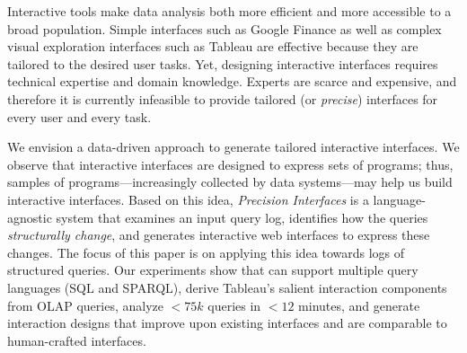 Interactive tools make data analysis both more efficient and more accessible to a broad population.  Simple interfaces such as Google Finance as well as complex visual exploration interfaces such as Tableau are effective because they are tailored to the desired user tasks. Yet, designing interactive interfaces requires technical expertise and domain knowledge. Experts are scarce and expensive, and therefore it is currently infeasible to provide tailored (or {\it precise}) interfaces for every user and every task.

We envision a data-driven approach to generate tailored interactive interfaces. We observe that interactive interfaces are designed to express sets of programs; thus, samples of programs---increasingly collected by data systems---may help us build interactive interfaces.  Based on this idea, {\it Precision Interfaces} is a language-agnostic system that examines an input query log, identifies how the queries {\it structurally change}, and generates interactive web interfaces to express these changes.  The focus of this paper is on applying this idea towards logs of structured queries.  Our experiments show that \sys can support multiple query languages (SQL and SPARQL), derive Tableau's salient interaction components from OLAP queries, analyze $<75k$ queries in $<12$ minutes, and generate interaction designs that improve upon existing interfaces and are comparable to human-crafted interfaces.




